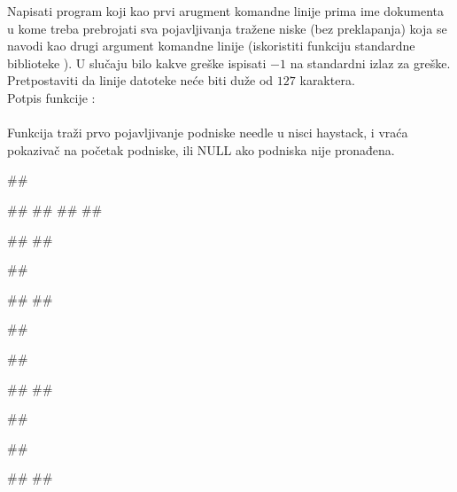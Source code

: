 \begin{Exercise}[label=A_04]
Napisati program koji kao prvi arugment komandne linije prima ime dokumenta u kome treba prebrojati sva pojavljivanja tražene niske (bez preklapanja) koja se navodi kao drugi argument komandne linije (iskoristiti funkciju standardne biblioteke ). U slučaju
bilo kakve greške ispisati $-1$ na standardni izlaz za greške.
Pretpostaviti da linije datoteke neće biti duže od $127$
karaktera.\\
Potpis funkcije :\\
\\
Funkcija traži prvo pojavljivanje podniske needle u nisci
haystack, i vraća pokazivač na početak podniske, ili
NULL ako podniska nije pronađena.

\begin{miditest}
\begin{test}{1}
##

##
##
##
##

#\naslovIzlaz#
##
\end{test}
\end{miditest}
\begin{miditest}
\begin{test}{2}
##

#\naslovIzlazZaGresku#
## 
\end{test}
\end{miditest}

\begin{miditest}
\begin{test}{3}
##

##

#\naslovIzlazZaGresku#
##
\end{test}
\end{miditest}
\begin{miditest}
\begin{test}{4}
##

##

#\naslovIzlaz#
##
\end{test}
\end{miditest}

\end{Exercise}
\begin{Answer}[ref=A_04]
\end{Answer}


